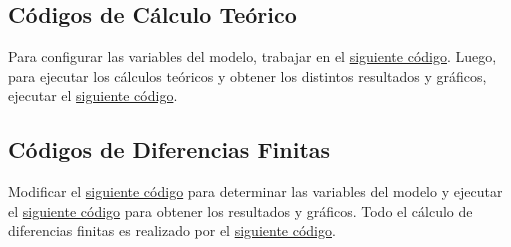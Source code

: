 \subsection{Códigos de Cálculo Teórico}

Para configurar las variables del modelo, trabajar en el \href{https://github.com/LukasWolff2002/ENTREGA_3_MCOC/blob/main/CODIGO/CALCULOS_MANUALES/variables.py}{siguiente código}. Luego, para ejecutar los cálculos teóricos y obtener los distintos resultados y gráficos, ejecutar el \href{https://github.com/LukasWolff2002/ENTREGA_3_MCOC/blob/main/CODIGO/CALCULOS_MANUALES/main.py}{siguiente código}.

\subsection{Códigos de Diferencias Finitas}

Modificar el \href{https://github.com/LukasWolff2002/ENTREGA_3_MCOC/blob/main/CODIGO/LAPLACE/variables.py}{siguiente código} para determinar las variables del modelo y ejecutar el \href{https://github.com/LukasWolff2002/ENTREGA_3_MCOC/blob/main/CODIGO/LAPLACE/main.py}{siguiente código} para obtener los resultados y gráficos. Todo el cálculo de diferencias finitas es realizado por el \href{https://github.com/LukasWolff2002/ENTREGA_3_MCOC/blob/main/CODIGO/LAPLACE/laplace_solver.py}{siguiente código}. 
